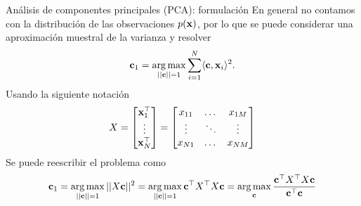 \documentclass[9pt]{beamer}
\begin{document}
\begin{frame}{Análisis de componentes principales (PCA): formulación}
En general no contamos con la distribución de las observaciones $p(\mathbf{x})$, por lo que se puede considerar una aproximación muestral de la varianza y resolver 
\begin{align*}
	\mathbf{c}_1 = \operatorname*{arg\,max}_{||\mathbf{c}||=1} \sum_{i=1}^N \langle\mathbf{c},\mathbf{x}_i\rangle^2.\label{eq:PCA_max2}
\end{align*} \pause
Usando la siguiente notación
$$
X=\begin{bmatrix}
        \mathbf{x}_1^\top\\
        \vdots\\
        \mathbf{x}_N^\top\\
        \end{bmatrix}=
        \begin{bmatrix}
        {x}_{11}    & \dots & {x}_{1M}  \\
        \vdots          & \ddots& \vdots        \\
        {x}_{N1}    & \dots & {x}_{NM}
        \end{bmatrix}
$$
\pause
Se puede reescribir el problema como
\begin{equation*}
	\mathbf{c}_1 = \operatorname*{arg\,max}_{||\mathbf{c}||=1} ||X\mathbf{c}||^2 
			= \operatorname*{arg\,max}_{||\mathbf{c}||=1} \mathbf{c}^\top X^\top X \mathbf{c}
			= \operatorname*{arg\,max}_{\mathbf{c}} \frac{\mathbf{c}^\top X^\top X \mathbf{c}}{\mathbf{c}^\top \mathbf{c}}
			\label{eq:PCA_max3}
\end{equation*}

\end{frame}
\end{document}
